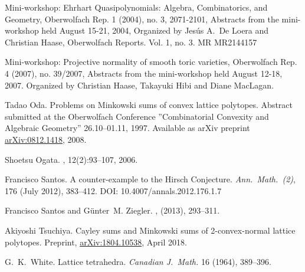 \documentclass{amsart}
\theoremstyle{plain}
\theoremstyle{definition}
\begin{document}
\begin{thebibliography}{99}
Mini-workshop: Ehrhart Quasipolynomials: Algebra, Combinatorics, and Geometry, Oberwolfach Rep. 1 (2004), no. 3, 2071-2101, Abstracts from the mini-workshop held August 15-21, 2004, Organized by Jes\'us A.~De Loera and Christian Haase, Oberwolfach Reports. Vol. 1, no. 3. MR MR2144157

Mini-workshop: Projective normality of smooth toric varieties, Oberwolfach Rep. 4 (2007), no. 39/2007, Abstracts from the mini-workshop held August 12-18, 2007. Organized by Christian Haase, Takayuki Hibi and Diane MacLagan.

Tadao Oda. Problems on Minkowski sums of convex lattice polytopes. 
Abstract submitted at the Oberwolfach Conference ''Combinatorial Convexity and Algebraic Geometry'' 26.10--01.11, 1997.
Available as arXiv preprint \href{https://arxiv.org/abs/0812.1418}{arXiv:0812.1418}, 2008.

Shoetsu Ogata.
, 12(2):93--107, 2006.

Francisco Santos.
A counter-example to the Hirsch Conjecture.
\emph{Ann.~Math.~(2)}, 176 (July 2012), 383--412. 
DOI: 10.4007/annals.2012.176.1.7

Francisco Santos and G{\"u}nter~M. Ziegler.
, 
 (2013), 293--311. %

Akiyoshi Tsuchiya.
Cayley sums and Minkowski sums of 2-convex-normal lattice polytopes.
Preprint,  \href{https://arxiv.org/abs/1804.10538}{arXiv:1804.10538}, April 2018.


G.~K.~White.
Lattice tetrahedra.
\emph{Canadian J.~Math.} 16 (1964), 389--396.

\end{thebibliography}
\end{document}
